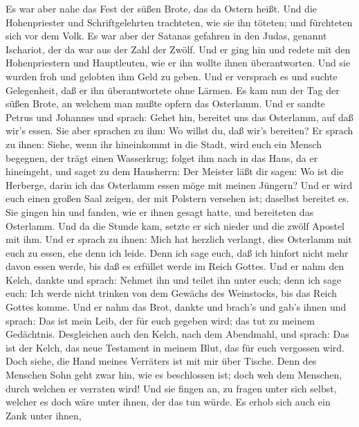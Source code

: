  Es war aber nahe das Fest der süßen Brote, das da Ostern
heißt.  Und die Hohenpriester und Schriftgelehrten
trachteten, wie sie ihn töteten; und fürchteten sich vor dem Volk.
 Es war aber der Satanas gefahren in den Judas, genannt
Ischariot, der da war aus der Zahl der Zwölf.  Und er ging
hin und redete mit den Hohenpriestern und Hauptleuten, wie er ihn wollte
ihnen überantworten.  Und sie wurden froh und gelobten ihm
Geld zu geben.  Und er versprach es und suchte Gelegenheit,
daß er ihn überantwortete ohne Lärmen.  Es kam nun der Tag
der süßen Brote, an welchem man mußte opfern das Osterlamm. 
Und er sandte Petrus und Johannes und sprach: Gehet hin, bereitet uns
das Osterlamm, auf daß wir's essen.  Sie aber sprachen zu
ihm: Wo willst du, daß wir's bereiten?  Er sprach zu ihnen:
Siehe, wenn ihr hineinkommt in die Stadt, wird euch ein Mensch begegnen,
der trägt einen Wasserkrug; folget ihm nach in das Haus, da er
hineingeht,  und saget zu dem Hausherrn: Der Meister läßt
dir sagen: Wo ist die Herberge, darin ich das Osterlamm essen möge mit
meinen Jüngern?  Und er wird euch einen großen Saal zeigen,
der mit Polstern versehen ist; daselbst bereitet es.  Sie
gingen hin und fanden, wie er ihnen gesagt hatte, und bereiteten das
Osterlamm.  Und da die Stunde kam, setzte er sich nieder
und die zwölf Apostel mit ihm.  Und er sprach zu ihnen:
Mich hat herzlich verlangt, dies Osterlamm mit euch zu essen, ehe denn
ich leide.  Denn ich sage euch, daß ich hinfort nicht mehr
davon essen werde, bis daß es erfüllet werde im Reich Gottes.
 Und er nahm den Kelch, dankte und sprach: Nehmet ihn und
teilet ihn unter euch;  denn ich sage euch: Ich werde nicht
trinken von dem Gewächs des Weinstocks, bis das Reich Gottes komme.
 Und er nahm das Brot, dankte und brach's und gab's ihnen
und sprach: Das ist mein Leib, der für euch gegeben wird; das tut zu
meinem Gedächtnis.  Desgleichen auch den Kelch, nach dem
Abendmahl, und sprach: Das ist der Kelch, das neue Testament in meinem
Blut, das für euch vergossen wird.  Doch siehe, die Hand
meines Verräters ist mit mir über Tische.  Denn des
Menschen Sohn geht zwar hin, wie es beschlossen ist; doch weh dem
Menschen, durch welchen er verraten wird!  Und sie fingen
an, zu fragen unter sich selbst, welcher es doch wäre unter ihnen, der
das tun würde.  Es erhob sich auch ein Zank unter ihnen,
